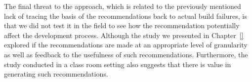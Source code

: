 The final threat to the approach, which is related to the previously mentioned lack of tracing the basis of the recommendations back to actual build failures, is that we did not test it in the field to see how the recommendation potentially affect the development process.
Although the study we presented in Chapter~\ref{} explored if the recommendations are made at an appropriate level of granularity as well as feedback to the usefulness of such recommendations.
Furthermore, the study conducted in a class room setting also suggests that there is value in generating such recommendations.

